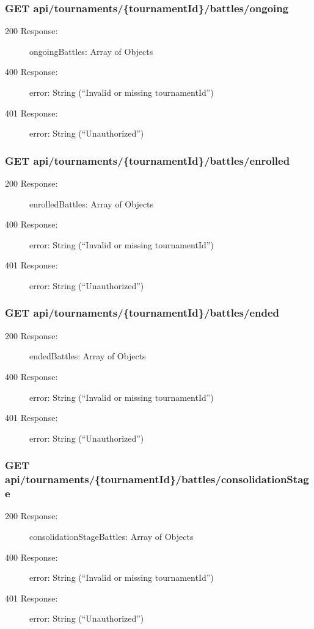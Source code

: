 \documentclass{Configuration_Files/Template}
\begin{document}
\subsubsection{GET api/tournaments/\{tournamentId\}/battles/ongoing}
\begin{description}
    \item[200 Response:] ongoingBattles: Array of Objects
    \item[400 Response:] error: String (“Invalid or missing tournamentId”)
    \item[401 Response:] error: String (“Unauthorized”)
\end{description}

\subsubsection{GET api/tournaments/\{tournamentId\}/battles/enrolled}
\begin{description}
    \item[200 Response:] enrolledBattles: Array of Objects
    \item[400 Response:] error: String (“Invalid or missing tournamentId”)
    \item[401 Response:] error: String (“Unauthorized”)
\end{description}

\subsubsection{GET api/tournaments/\{tournamentId\}/battles/ended}
\begin{description}
    \item[200 Response:] endedBattles: Array of Objects
    \item[400 Response:] error: String (“Invalid or missing tournamentId”)
    \item[401 Response:] error: String (“Unauthorized”)
\end{description}

\subsubsection{GET api/tournaments/\{tournamentId\}/battles/consolidationStage}
\begin{description}
    \item[200 Response:] consolidationStageBattles: Array of Objects
    \item[400 Response:] error: String (“Invalid or missing tournamentId”)
    \item[401 Response:] error: String (“Unauthorized”)
\end{description}
\end{document}
